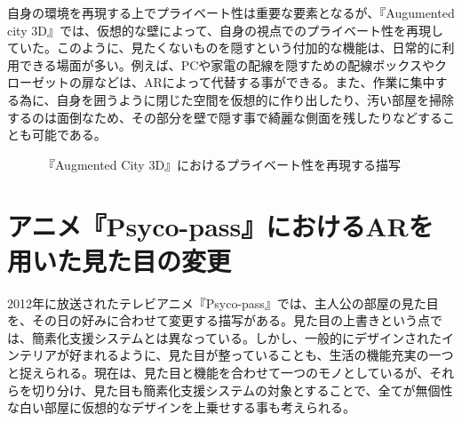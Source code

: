 自身の環境を再現する上でプライベート性は重要な要素となるが、『Augumented city 3D』では、仮想的な壁によって、自身の視点でのプライベート性を再現していた。このように、見たくないものを隠すという付加的な機能は、日常的に利用できる場面が多い。例えば、PCや家電の配線を隠すための配線ボックスやクローゼットの扉などは、ARによって代替する事ができる。また、作業に集中する為に、自身を囲うように閉じた空間を仮想的に作り出したり、汚い部屋を掃除するのは面倒なため、その部分を壁で隠す事で綺麗な側面を残したりなどすることも可能である。

\begin{figure}[htbp]
  \begin{minipage}{0.5\hsize}
    \begin{center}
    \end{center}
  \end{minipage}
  \begin{minipage}{0.5\hsize}
    \begin{center}
    \end{center}
  \end{minipage}
  \caption{『Augmented City 3D』におけるプライベート性を再現する描写}
\end{figure}


\section{アニメ『Psyco-pass』におけるARを用いた見た目の変更}

2012年に放送されたテレビアニメ『Psyco-pass』では、主人公の部屋の見た目を、その日の好みに合わせて変更する描写がある。見た目の上書きという点では、簡素化支援システムとは異なっている。しかし、一般的にデザインされたインテリアが好まれるように、見た目が整っていることも、生活の機能充実の一つと捉えられる。現在は、見た目と機能を合わせて一つのモノとしているが、それらを切り分け、見た目も簡素化支援システムの対象とすることで、全てが無個性な白い部屋に仮想的なデザインを上乗せする事も考えられる。

